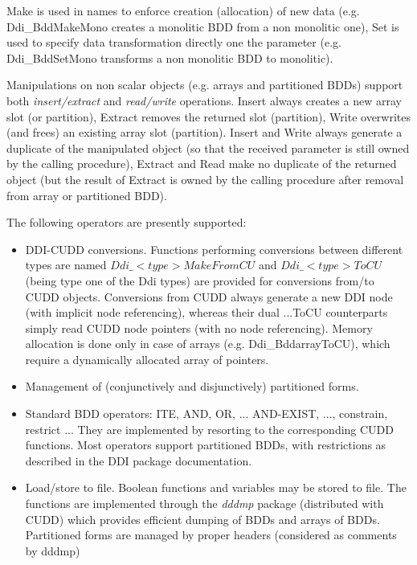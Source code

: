 {\sf Make} is used in names to enforce creation (allocation) of new
data (e.g. {\sf Ddi\_BddMakeMono} creates a monolitic BDD from a non
monolitic one), {\sf Set } is used to specify data transformation
directly one the parameter (e.g. {\sf Ddi\_BddSetMono} transforms a non 
monolitic BDD to monolitic). 

Manipulations on non scalar objects
(e.g. arrays and partitioned BDDs) support both {\em insert/extract}
and {\em read/write} operations. {\sf Insert} always creates a new
array slot (or partition), {\sf Extract} removes the returned slot
(partition), {\sf Write} overwrites (and frees) an existing array slot
(partition). {\sf Insert} and {\sf Write} always generate a duplicate
of the manipulated object (so that the received parameter is still
owned by the calling procedure), {\sf Extract} and {\sf Read} make no 
duplicate of the returned object (but the result of {\sf Extract} is
owned by the calling procedure after removal from array or partitioned BDD).

The following operators are presently supported:

\begin{itemize}

\item 

DDI-CUDD conversions. Functions performing conversions between
different types are named $Ddi\_<type>MakeFromCU$ and $Ddi\_<type>ToCU$ 
(being type one of the Ddi types) are provided for conversions from/to CUDD 
objects. Conversions from CUDD always generate a new DDI node (with
implicit node referencing), whereas
their dual ...ToCU counterparts simply read CUDD node pointers (with
no node referencing). Memory allocation is done only in case of
arrays (e.g. Ddi\_BddarrayToCU), which require a dynamically allocated
array of pointers.

\item

Management of (conjunctively and disjunctively) partitioned forms. 

\item
Standard BDD operators: ITE, AND, OR, ... AND-EXIST, ..., constrain, 
restrict ...
They are implemented by resorting to the corresponding CUDD functions.
Most operators support partitioned BDDs, with restrictions as
described in the DDI package documentation.

\item 
Load/store to file. Boolean functions and variables may be stored to file.
The functions are implemented through the {\em dddmp} package
(distributed with CUDD) which provides efficient dumping of BDDs and arrays of BDDs.
Partitioned forms are managed by proper headers (considered as comments by dddmp)

\end{itemize}

